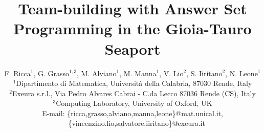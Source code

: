 \documentclass{tlp}
\begin{document}
\def\punto{\hspace*{\fill}{\rule[-0.5mm]{1.5mm}{3mm}}}

\newcommand{\GR}{\ensuremath{Ground(\R)}}
\newcommand{\R}{\ensuremath{r}}
\newcommand{\tneg}{\ensuremath{\neg}}

\newcommand{\p}{\ensuremath{{\cal P}}\xspace}
\newcommand{\GP}{\ensuremath{Ground(\p)}\xspace}
\newcommand{\BP}{\ensuremath{B_{\p}}\xspace}
\newcommand{\UP}{\ensuremath{U_{\p}}\xspace}

\newcommand{\NP}{{\rm NP}\xspace}
\newcommand{\SigmaP}[1]{{\Sigma}_{#1}^{P}}
\newcommand{\CONP}{\textrm{co-NP}\xspace}
\newcommand{\PiP}[1]{{\Pi}_{#1}^{P}}

\newcommand{\iec}[0]{i.e.,\ }
\newcommand{\egc}[0]{e.g.,\ }

\newcommand{\mytt}[1]{{\small\texttt{#1}}\xspace}

\title[Team-building with ASP in Gioia-Tauro Seaport]{Team-building with Answer Set Programming in the Gioia-Tauro Seaport}

\author[F. Ricca et. al]
{ F. Ricca$^1$, G. Grasso$^{1,3}$, M. Alviano$^1$, M. Manna$^1$, V. Lio$^2$, S. Iiritano$^2$, N. Leone$^1$\\
$^1$Dipartimento di Matematica, Universit{\`a} della Calabria, 87030 Rende, Italy\\
$^2$Exeura s.r.l., Via Pedro Alvares Cabrai - C.da Lecco 87036 Rende (CS), Italy\\
$^3$Computing Laboratory, University of Oxford, UK\\
E-mail: \{ricca,grasso,alviano,manna,leone\}@mat.unical.it, \\
\ \ \,\{vincenzino.lio,salvatore.iiritano\}@exeura.it
}


\pagerange{\pageref{firstpage}--\pageref{lastpage}}
\setcounter{page}{1}


\maketitle

\label{firstpage}
\end{document}
